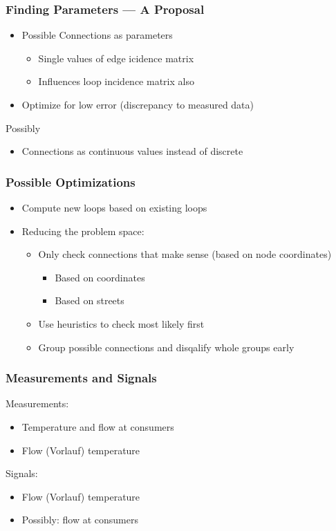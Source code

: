 \documentclass{beamer}
\begin{document}
\begin{frame}
\frametitle{Finding Parameters --- A Proposal}
  \begin{itemize}
    \item Possible Connections as parameters
      \begin{itemize}
        \item Single values of edge icidence matrix
        \item Influences loop incidence matrix also
      \end{itemize}
    \item Optimize for low error (discrepancy to measured data)
  \end{itemize}

  \vspace{2em}

  Possibly
  \begin{itemize}
    \item Connections as continuous values instead of discrete
  \end{itemize}
\end{frame}

\begin{frame}
\frametitle{Possible Optimizations}
  \begin{itemize}
    \item Compute new loops based on existing loops
    \item Reducing the problem space:
    \begin{itemize}
      \item Only check connections that make sense (based on node coordinates)
        \begin{itemize}
          \item Based on coordinates
          \item Based on streets
        \end{itemize}
      \item Use heuristics to check most likely first
      \item Group possible connections and disqalify whole groups early
    \end{itemize}
  \end{itemize}
\end{frame}

\begin{frame}
\frametitle{Measurements and Signals}
  Measurements:
  \begin{itemize}
    \item Temperature and flow at consumers
    \item Flow (Vorlauf) temperature
  \end{itemize}

  \vspace{2em}

  Signals:
  \begin{itemize}
    \item Flow (Vorlauf) temperature
    \item Possibly: flow at consumers
  \end{itemize}
\end{frame}
\end{document}
